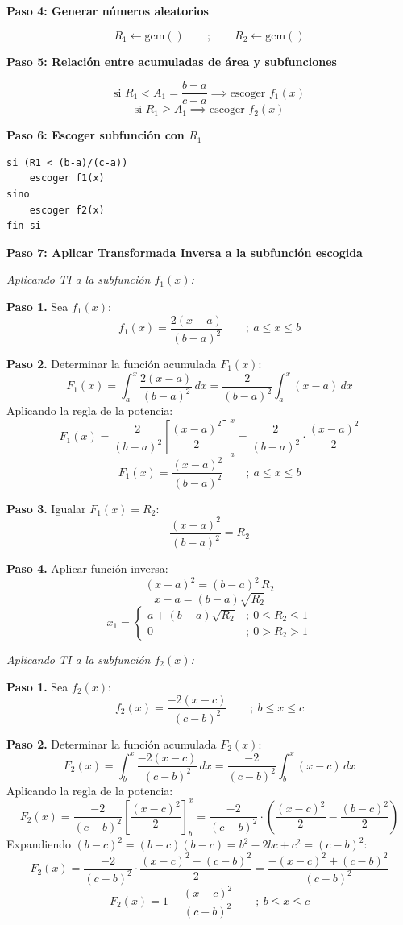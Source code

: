 \documentclass[12pt, a4paper]{article}
\begin{document}
\textbf{Paso 4: Generar números aleatorios}

\[
R_1 \leftarrow \text{gcm}() \qquad ; \qquad R_2 \leftarrow \text{gcm}()
\]

\textbf{Paso 5: Relación entre acumuladas de área y subfunciones}

\[
\text{si } R_1 < A_1 = \frac{b-a}{c-a} \implies \text{escoger } f_1(x)
\]
\[
\text{si } R_1 \geq A_1 \implies \text{escoger } f_2(x)
\]

\textbf{Paso 6: Escoger subfunción con $R_1$}

\begin{lstlisting}[caption={Selección de subfunción}, language=Pascal]
si (R1 < (b-a)/(c-a))
    escoger f1(x)
sino
    escoger f2(x)
fin si
\end{lstlisting}

\textbf{Paso 7: Aplicar Transformada Inversa a la subfunción escogida}

\textit{Aplicando TI a la subfunción $f_1(x)$:}

\textbf{Paso 1.} Sea $f_1(x)$:
\[
f_1(x) = \frac{2(x-a)}{(b-a)^2} \qquad ;\ a \leq x \leq b
\]

\textbf{Paso 2.} Determinar la función acumulada $F_1(x)$:
\[
F_1(x) = \int_a^x \frac{2(x-a)}{(b-a)^2}\,dx = \frac{2}{(b-a)^2} \int_a^x (x-a)\,dx
\]
Aplicando la regla de la potencia:
\[
F_1(x) = \frac{2}{(b-a)^2} \left[\frac{(x-a)^2}{2}\right]_a^x = \frac{2}{(b-a)^2}\cdot\frac{(x-a)^2}{2}
\]
\[
\boxed{F_1(x) = \frac{(x-a)^2}{(b-a)^2}} \qquad ;\ a \leq x \leq b
\]

\textbf{Paso 3.} Igualar $F_1(x) = R_2$:
\[
\frac{(x-a)^2}{(b-a)^2} = R_2
\]

\textbf{Paso 4.} Aplicar función inversa:
\[
(x-a)^2 = (b-a)^2\,R_2
\]
\[
x - a = (b-a)\sqrt{R_2}
\]
\[
x_1=\begin{cases}a+(b-a)\sqrt{R_2} &;\ 0 \leq R_2 \leq 1 \\ 0 &;\ 0 > R_2 > 1\end{cases}
\]

\textit{Aplicando TI a la subfunción $f_2(x)$:}

\textbf{Paso 1.} Sea $f_2(x)$:
\[
f_2(x) = \frac{-2(x-c)}{(c-b)^2} \qquad ;\ b \leq x \leq c
\]

\textbf{Paso 2.} Determinar la función acumulada $F_2(x)$:
\[
F_2(x) = \int_b^x \frac{-2(x-c)}{(c-b)^2}\,dx = \frac{-2}{(c-b)^2} \int_b^x (x-c)\,dx
\]
Aplicando la regla de la potencia:
\[
F_2(x) = \frac{-2}{(c-b)^2}\left[\frac{(x-c)^2}{2}\right]_b^x = \frac{-2}{(c-b)^2}\cdot\left(\frac{(x-c)^2}{2} - \frac{(b-c)^2}{2}\right)
\]
Expandiendo $(b-c)^2 = (b-c)(b-c) = b^2-2bc+c^2 = (c-b)^2$:
\[
F_2(x) = \frac{-2}{(c-b)^2}\cdot\frac{(x-c)^2-(c-b)^2}{2} = \frac{-(x-c)^2+(c-b)^2}{(c-b)^2}
\]
\[
\boxed{F_2(x) = 1 - \frac{(x-c)^2}{(c-b)^2}} \qquad ;\ b \leq x \leq c
\]
\end{document}
